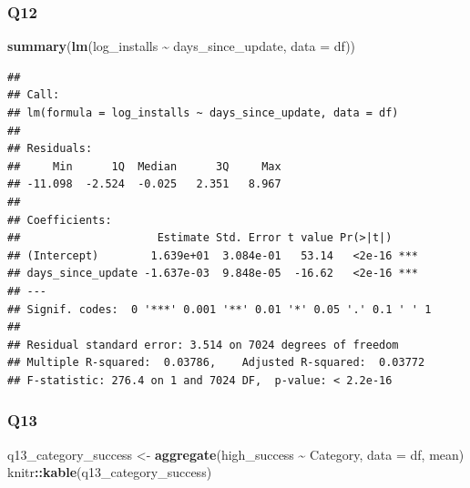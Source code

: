 \documentclass[
]{article}
\newenvironment{Shaded}{\begin{snugshade}}{\end{snugshade}}
\newcommand{\AttributeTok}[1]{\textcolor[rgb]{0.13,0.29,0.53}{#1}}
\newcommand{\FunctionTok}[1]{\textcolor[rgb]{0.13,0.29,0.53}{\textbf{#1}}}
\newcommand{\NormalTok}[1]{#1}
\newcommand{\OtherTok}[1]{\textcolor[rgb]{0.56,0.35,0.01}{#1}}
\newcommand{\SpecialCharTok}[1]{\textcolor[rgb]{0.81,0.36,0.00}{\textbf{#1}}}
\begin{document}
\subsubsection{Q12}\label{q12}

\begin{Shaded}
\begin{Highlighting}[]
\FunctionTok{summary}\NormalTok{(}\FunctionTok{lm}\NormalTok{(log\_installs }\SpecialCharTok{\textasciitilde{}}\NormalTok{ days\_since\_update, }\AttributeTok{data =}\NormalTok{ df))}
\end{Highlighting}
\end{Shaded}

\begin{verbatim}
## 
## Call:
## lm(formula = log_installs ~ days_since_update, data = df)
## 
## Residuals:
##     Min      1Q  Median      3Q     Max 
## -11.098  -2.524  -0.025   2.351   8.967 
## 
## Coefficients:
##                     Estimate Std. Error t value Pr(>|t|)    
## (Intercept)        1.639e+01  3.084e-01   53.14   <2e-16 ***
## days_since_update -1.637e-03  9.848e-05  -16.62   <2e-16 ***
## ---
## Signif. codes:  0 '***' 0.001 '**' 0.01 '*' 0.05 '.' 0.1 ' ' 1
## 
## Residual standard error: 3.514 on 7024 degrees of freedom
## Multiple R-squared:  0.03786,    Adjusted R-squared:  0.03772 
## F-statistic: 276.4 on 1 and 7024 DF,  p-value: < 2.2e-16
\end{verbatim}

\subsubsection{Q13}\label{q13}

\begin{Shaded}
\begin{Highlighting}[]
\NormalTok{q13\_category\_success }\OtherTok{\textless{}{-}} \FunctionTok{aggregate}\NormalTok{(high\_success }\SpecialCharTok{\textasciitilde{}}\NormalTok{ Category, }\AttributeTok{data =}\NormalTok{ df, mean)}
\NormalTok{knitr}\SpecialCharTok{::}\FunctionTok{kable}\NormalTok{(q13\_category\_success)}
\end{Highlighting}
\end{Shaded}
\end{document}
